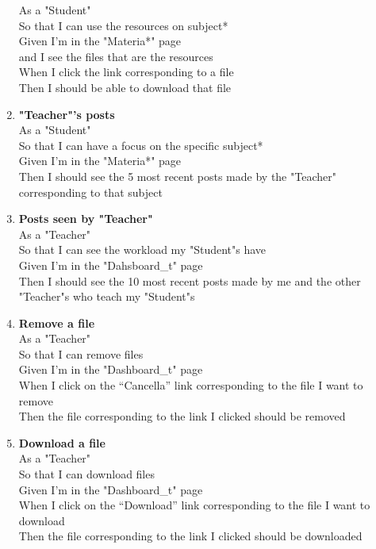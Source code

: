 \documentclass[Lau, binding=0.6cm, oneside]{sapthesis}
\begin{document}
\begin{enumerate}
			As a "Student"\\
			So that I can use the resources on subject*\\
			Given I’m in the "Materia*" page\\
			and I see the files that are the resources\\
			When I click the link corresponding to a file\\
			Then I should be able to download that file\\
	\item \textbf{"Teacher"’s posts}\\
			As a "Student"\\
			So that I can have a focus on the specific subject*\\
			Given I’m in the "Materia*" page\\
			Then I should see the 5 most recent posts made by the "Teacher" corresponding to that subject\\
	\item \textbf{Posts seen by "Teacher"}\\
			As a "Teacher"\\
			So that I can see the workload my "Student"s have\\
			Given I’m in the "Dahsboard\_t" page\\
			Then I should see the 10 most recent posts made by me and the other "Teacher"s who teach my "Student"s\\
	\item \textbf{Remove a file}\\
			As a "Teacher"\\
			So that I can remove files\\
			Given I’m in the "Dashboard\_t" page\\
			When I click on the “Cancella” link corresponding to the file I want to remove\\
			Then the file corresponding to the link I clicked should be removed\\
	\item \textbf{Download a file}\\
			As a "Teacher"\\
			So that I can download files\\
			Given I’m in the "Dashboard\_t" page\\
			When I click on the “Download” link corresponding to the file I want to download\\
			Then the file corresponding to the link I clicked should be downloaded\\

\end{enumerate}
\end{document}
